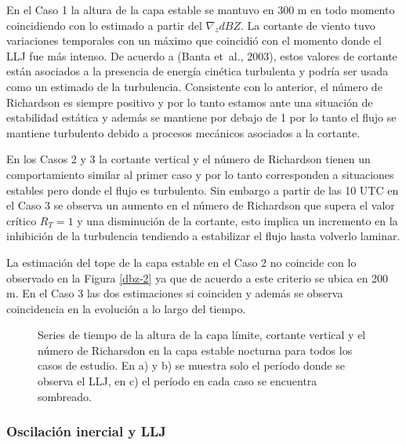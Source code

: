 \documentclass[12pt,spanish,oneside]{book}
\begin{document}
En el Caso 1 la altura de la capa estable se mantuvo en 300 m en todo
momento coincidiendo con lo estimado a partir del \(\nabla_z dBZ\). La
cortante de viento tuvo variaciones temporales con un máximo que
coincidió con el momento donde el LLJ fue más intenso. De acuerdo a
(Banta et~al., 2003), estos valores de cortante están asociados a la
presencia de energía cinética turbulenta y podría ser usada como un
estimado de la turbulencia. Consistente con lo anterior, el número de
Richardson es siempre positivo y por lo tanto estamos ante una situación
de estabilidad estática y además se mantiene por debajo de 1 por lo
tanto el flujo se mantiene turbulento debido a procesos mecánicos
asociados a la cortante.

En los Casos 2 y 3 la cortante vertical y el número de Richardson tienen
un comportamiento similar al primer caso y por lo tanto corresponden a
situaciones estables pero donde el flujo es turbulento. Sin embargo a
partir de las 10 UTC en el Caso 3 se observa un aumento en el número de
Richardson que supera el valor crítico \(R_T=1\) y una disminución de la
cortante, esto implica un incremento en la inhibición de la turbulencia
tendiendo a estabilizar el flujo hasta volverlo laminar.

La estimación del tope de la capa estable en el Caso 2 no coincide con
lo observado en la Figura \ref{dbz-2} ya que de acuerdo a este criterio
se ubica en 200 m. En el Caso 3 las dos estimaciones si coinciden y
además se observa coincidencia en la evolución a lo largo del tiempo.

\begin{figure}
\newline{}\newline{}\caption{Series de tiempo de la altura de la capa límite, cortante vertical y el número de Richarsdon en la capa estable nocturna para todos los casos de estudio. En a) y b) se muestra solo el período donde se observa el LLJ, en c) el período en cada caso se encuentra sombreado. \label{estable-vad}}\label{fig:estable-vad}
\end{figure}

\subsubsection{Oscilación inercial y
LLJ}\label{oscilacion-inercial-y-llj}
\end{document}
